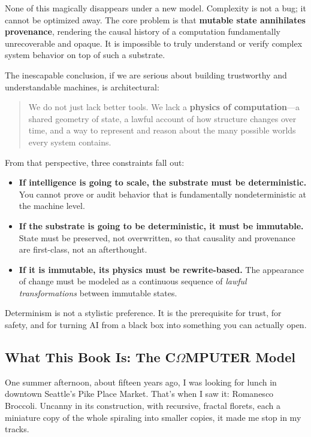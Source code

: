 None of this magically disappears under a new model. Complexity is not a bug; it cannot be optimized away. The core problem is that \textbf{mutable state annihilates provenance}, rendering the causal history of a computation fundamentally unrecoverable and opaque. It is impossible to truly understand or verify complex system behavior on top of such a substrate.

\noindent
The inescapable conclusion, if we are serious about building trustworthy and understandable machines, is architectural:

\begin{quote}
We do not just lack better tools. We lack a \textbf{physics of computation}---a shared
geometry of state, a lawful account of how structure changes over time, and a
way to represent and reason about the many possible worlds every system
contains.
\end{quote}

\noindent
From that perspective, three constraints fall out:

\begin{itemize}
    \item \textbf{If intelligence is going to scale, the substrate must be deterministic.} You cannot prove or audit behavior that is fundamentally nondeterministic at the machine level.
    \item \textbf{If the substrate is going to be deterministic, it must be immutable.} State must be preserved, not overwritten, so that causality and provenance are first-class, not an afterthought.
    \item \textbf{If it is immutable, its physics must be rewrite-based.} The appearance of change must be modeled as a continuous sequence of \emph{lawful transformations} between immutable states.
\end{itemize}

Determinism is not a stylistic preference. It is the prerequisite for trust, for safety, and for turning AI from a black box into something you can actually open.

\subsection*{What This Book Is: The C\texorpdfstring{\boldmath$\Omega$}{Omega}MPUTER Model}

One summer afternoon, about fifteen years ago, I was looking for lunch in downtown Seattle's Pike Place Market. That's when I saw it: Romanesco Broccoli. Uncanny in its construction, with recursive, fractal florets, each a miniature copy of the whole spiraling into smaller copies, it made me stop in my tracks.


